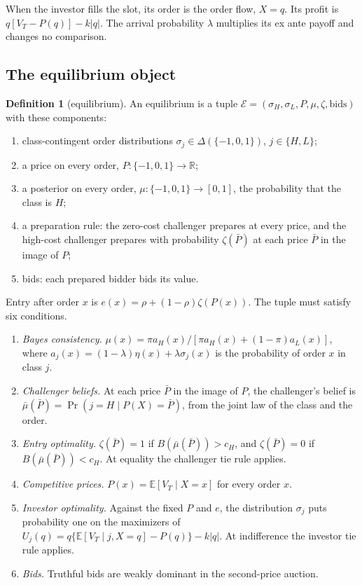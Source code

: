 \documentclass[11pt]{article}
\theoremstyle{definition}
\newtheorem{definition}{Definition}
\newcommand{\E}{\mathbb E}
\begin{document}
When the investor fills the slot, its order is the order flow, $X=q$. Its profit is $q[V_T-P(q)]-k|q|$.
The arrival probability $\lambda$ multiplies its ex ante payoff and changes no comparison.

\subsection{The equilibrium object}

\begin{definition}[equilibrium]\label{def:eq}
An equilibrium is a tuple $\mathcal E=(\sigma_H,\sigma_L,P,\mu,\zeta,\text{bids})$ with these components:
\begin{enumerate}[label=(\roman*)]
\item class-contingent order distributions $\sigma_j\in\Delta(\{-1,0,1\})$, $j\in\{H,L\}$;
\item a price on every order, $P:\{-1,0,1\}\to\mathbb R$;
\item a posterior on every order, $\mu:\{-1,0,1\}\to[0,1]$, the probability that the class is $H$;
\item a preparation rule: the zero-cost challenger prepares at every price, and the high-cost challenger
  prepares with probability $\zeta(\bar P)$ at each price $\bar P$ in the image of $P$;
\item bids: each prepared bidder bids its value.
\end{enumerate}
Entry after order $x$ is $e(x)=\rho+(1-\rho)\zeta(P(x))$. The tuple must satisfy six conditions.
\begin{enumerate}[label=(E\arabic*)]
\item \emph{Bayes consistency.} $\mu(x)=\pi a_H(x)/[\pi a_H(x)+(1-\pi)a_L(x)]$, where
  $a_j(x)=(1-\lambda)\eta(x)+\lambda\sigma_j(x)$ is the probability of order $x$ in class $j$.
\item \emph{Challenger beliefs.} At each price $\bar P$ in the image of $P$, the challenger's belief is
  $\bar\mu(\bar P)=\Pr(j=H\mid P(X)=\bar P)$, from the joint law of the class and the order.
\item \emph{Entry optimality.} $\zeta(\bar P)=1$ if $B(\bar\mu(\bar P))>c_H$, and $\zeta(\bar P)=0$ if
  $B(\bar\mu(\bar P))<c_H$. At equality the challenger tie rule applies.
\item \emph{Competitive prices.} $P(x)=\E[V_T\mid X=x]$ for every order $x$.
\item \emph{Investor optimality.} Against the fixed $P$ and $e$, the distribution $\sigma_j$ puts probability one
  on the maximizers of $U_j(q)=q\{\E[V_T\mid j,X=q]-P(q)\}-k|q|$. At indifference the investor tie rule applies.
\item \emph{Bids.} Truthful bids are weakly dominant in the second-price auction.
\end{enumerate}
\end{definition}
\end{document}
